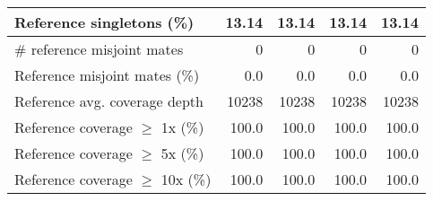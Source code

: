 \documentclass[12pt,a4paper]{article}
\begin{document}
\begin{table}[ht]
\begin{center}
\begin{tabular}{|l*{4}{|r}|}
Reference singletons (\%) & 13.14 & 13.14 & 13.14 & 13.14 \\ \hline
\# reference misjoint mates & 0 & 0 & 0 & 0 \\ \hline
Reference misjoint mates (\%) & 0.0 & 0.0 & 0.0 & 0.0 \\ \hline
Reference avg. coverage depth & 10238 & 10238 & 10238 & 10238 \\ \hline
Reference coverage $\geq$ 1x (\%) & 100.0 & 100.0 & 100.0 & 100.0 \\ \hline
Reference coverage $\geq$ 5x (\%) & 100.0 & 100.0 & 100.0 & 100.0 \\ \hline
Reference coverage $\geq$ 10x (\%) & 100.0 & 100.0 & 100.0 & 100.0 \\ \hline
\end{tabular}
\end{center}
\end{table}
\end{document}
